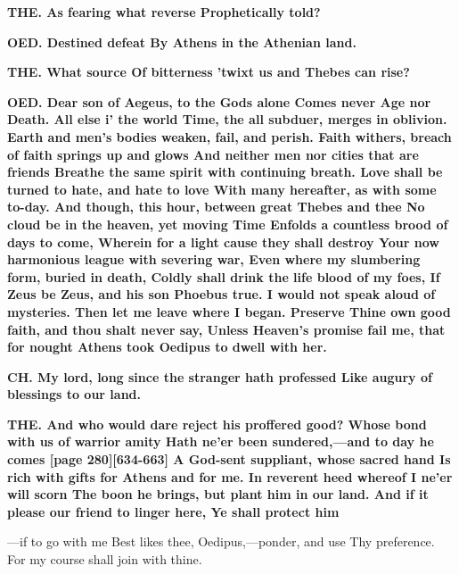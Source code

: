 \documentclass[11pt,letter]{book}
\begin{document}
\par \textbf{THE. As fearing what reverse Prophetically told?}
\par 

\par \textbf{OED. Destined defeat By Athens in the Athenian land.}
\par 

\par \textbf{THE. What source Of bitterness ’twixt us and Thebes can rise?}
\par 

\par \textbf{OED. Dear son of Aegeus, to the Gods alone Comes never Age nor Death. All else i’ the world Time, the all subduer, merges in oblivion. Earth and men’s bodies weaken, fail, and perish. Faith withers, breach of faith springs up and glows And neither men nor cities that are friends Breathe the same spirit with continuing breath. Love shall be turned to hate, and hate to love With many hereafter, as with some to-day. And though, this hour, between great Thebes and thee No cloud be in the heaven, yet moving Time Enfolds a countless brood of days to come, Wherein for a light cause they shall destroy Your now harmonious league with severing war, Even where my slumbering form, buried in death, Coldly shall drink the life blood of my foes, If Zeus be Zeus, and his son Phoebus true. I would not speak aloud of mysteries. Then let me leave where I began. Preserve Thine own good faith, and thou shalt never say, Unless Heaven’s promise fail me, that for nought Athens took Oedipus to dwell with her.}
\par 

\par \textbf{CH. My lord, long since the stranger hath professed Like augury of blessings to our land.}
\par 

\par \textbf{THE. And who would dare reject his proffered good? Whose bond with us of warrior amity Hath ne’er been sundered,—and to day he comes [page 280][634-663] A God-sent suppliant, whose sacred hand Is rich with gifts for Athens and for me. In reverent heed whereof I ne’er will scorn The boon he brings, but plant him in our land. And if it please our friend to linger here, Ye shall protect him}
\par  —if to go with me Best likes thee, Oedipus,—ponder, and use Thy preference. For my course shall join with thine.
\end{document}
